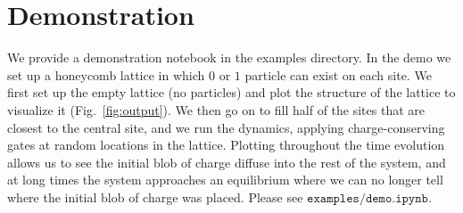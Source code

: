\documentclass{article}
\begin{document}
\section{Demonstration}
\label{sec:demo}
We provide a demonstration notebook in the examples directory. In the demo we set up a honeycomb lattice in which $0$ or $1$ particle can exist on each site. We first set up the empty lattice (no particles) and plot the structure of the lattice to visualize it (Fig.~\ref{fig:output}). We then go on to fill half of the sites that are closest to the central site, and we run the dynamics, applying charge-conserving gates at random locations in the lattice. Plotting throughout the time evolution allows us to see the initial blob of charge diffuse into the rest of the system, and at long times the system approaches an equilibrium where we can no longer tell where the initial blob of charge was placed. Please see $\texttt{examples/demo.ipynb}$.
\end{document}
